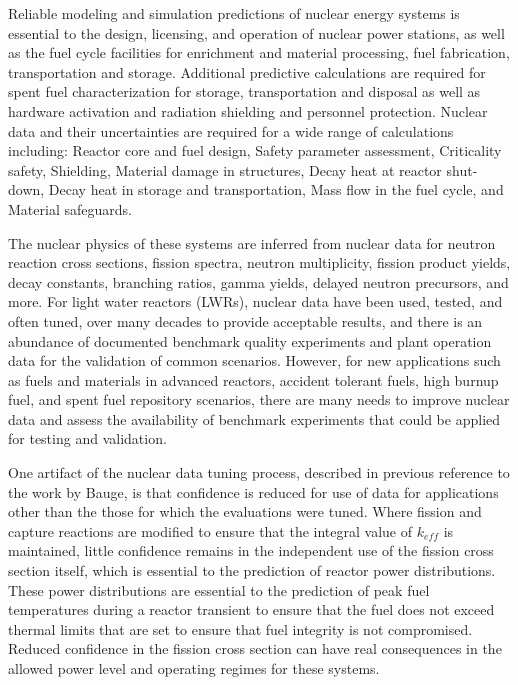 \documentclass[letterpaper,draft]{ar-1col}
\begin{document}
Reliable modeling and simulation predictions of nuclear energy systems is essential to the design, licensing, and operation of nuclear power stations, as well as the fuel cycle facilities for enrichment and material processing, fuel fabrication, transportation and storage. Additional predictive calculations are required for spent fuel characterization for storage, transportation and disposal as well as hardware activation and radiation shielding and personnel protection. Nuclear data and their uncertainties are required for a wide range of calculations including:
Reactor core and fuel design,
Safety parameter assessment,
Criticality safety,
Shielding,
Material damage in structures,
Decay heat at reactor shut-down,
Decay heat in storage and transportation,
Mass flow in the fuel cycle, and
Material safeguards.

The nuclear physics of these systems are inferred from nuclear data for neutron reaction cross sections, fission spectra, neutron multiplicity, fission product yields, decay constants, branching ratios, gamma yields, delayed neutron precursors, and more.  For light water reactors (LWRs), nuclear data have been used, tested, and often tuned, over many decades to provide acceptable results, and there is an abundance of documented benchmark quality experiments and plant operation data for the validation of common scenarios. However, for new applications such as fuels and materials in advanced reactors, accident tolerant fuels, high burnup fuel, and spent fuel repository scenarios, there are many needs to improve nuclear data and assess the availability of benchmark experiments that could be applied for testing and validation. 

One artifact of the nuclear data tuning process, described in previous reference to the work by Bauge, is that confidence is reduced for use of data for applications other than the those for which the evaluations were tuned. Where fission and capture reactions are modified to ensure that the integral value of $k_{eff}$ is maintained, little confidence remains in the independent use of the fission cross section itself, which is essential to the prediction of reactor power distributions. These power distributions are essential to the prediction of peak fuel temperatures during a reactor transient to ensure that the fuel does not exceed thermal limits that are set to ensure that fuel integrity is not compromised. Reduced confidence in the fission cross section can have real consequences in the allowed power level and operating regimes for these systems.
\end{document}
